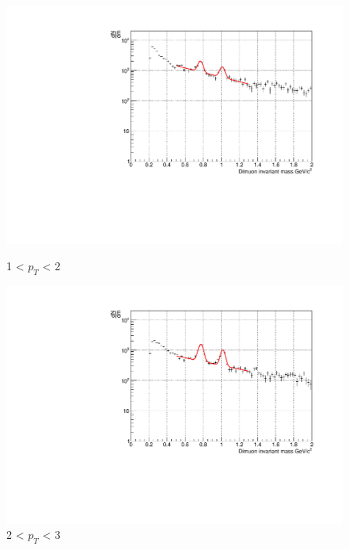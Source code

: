                 \begin{figure}[H]
                    \centering
                    \begin{minipage}{0.45\textwidth}
                        \centering
                        \includegraphics[width=\textwidth]{fig/3_4_2_fit_pt_1to2.pdf}
                        \captionsetup{labelformat=empty}
                        \caption*{1 < $p_{T}$ < 2}
                    \end{minipage}
                    \hfill
                    \begin{minipage}{0.45\textwidth}
                        \centering
                        \includegraphics[width=\textwidth]{fig/3_4_2_fit_pt_2to3.pdf}
                        \captionsetup{labelformat=empty}
                        \caption*{2 < $p_{T}$ < 3}

\end{minipage}
\end{figure}
